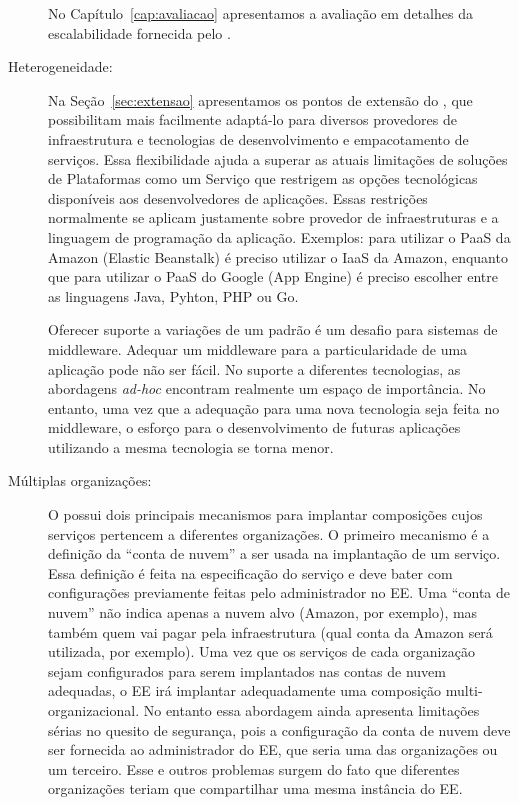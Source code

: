 \begin{description}
No Capítulo~\ref{cap:avaliacao} apresentamos a avaliação em detalhes da 
escalabilidade fornecida pelo \ee.

\item [Heterogeneidade:]

Na Seção~\ref{sec:extensao} apresentamos os pontos de extensão do \ee,
que possibilitam mais facilmente adaptá-lo para diversos provedores de infraestrutura
e tecnologias de desenvolvimento e empacotamento de serviços.
Essa flexibilidade ajuda a superar
as atuais limitações de soluções de Plataformas como um Serviço
que restrigem as opções tecnológicas disponíveis aos desenvolvedores de aplicações.
Essas restrições normalmente se aplicam justamente sobre
provedor de infraestruturas e a linguagem de programação da aplicação.
Exemplos: para utilizar o PaaS da Amazon (Elastic Beanstalk) é preciso utilizar
o IaaS da Amazon, enquanto que para utilizar o PaaS do Google (App Engine)
é preciso escolher entre as linguagens Java, Pyhton, PHP ou Go.

Oferecer suporte a variações de um padrão é um desafio para sistemas de middleware.
Adequar um middleware para a particularidade de uma aplicação pode não ser fácil.
No suporte a diferentes tecnologias, as abordagens \emph{ad-hoc} encontram realmente um espaço de importância.
No entanto, uma vez que a adequação para uma nova tecnologia seja feita no middleware,
o esforço para o desenvolvimento de futuras aplicações utilizando a mesma tecnologia
se torna menor.

\item [Múltiplas organizações:]

O \ee possui dois principais mecanismos para implantar composições cujos serviços
pertencem a diferentes organizações.
O primeiro mecanismo é a definição da ``conta de nuvem'' a ser usada na implantação de um serviço.
Essa definição é feita na especificação do serviço e deve bater com configurações
previamente feitas pelo administrador no EE.
Uma ``conta de nuvem'' não indica apenas a nuvem alvo (Amazon, por exemplo),
mas também quem vai pagar pela infraestrutura (qual conta da Amazon será utilizada, por exemplo).
Uma vez que os serviços de cada organização sejam configurados para serem implantados
nas contas de nuvem adequadas, o EE irá implantar adequadamente uma composição
multi-organizacional.
No entanto essa abordagem ainda apresenta limitações sérias no quesito de segurança,
pois a configuração da conta de nuvem deve ser fornecida ao administrador do EE,
que seria uma das organizações ou um terceiro.
Esse e outros problemas surgem do fato que diferentes organizações teriam que
compartilhar uma mesma instância do EE.


\end{description}
